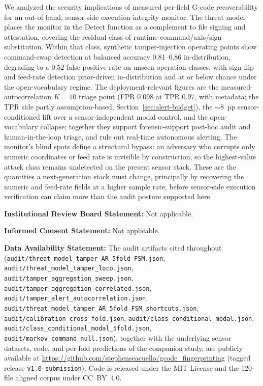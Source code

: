 \documentclass[sensors,article,submit,moreauthors,pdftex]{Definitions/mdpi}
\providecommand{\institutionalreview}[1]{\medskip\noindent\textbf{Institutional Review Board Statement:} #1\par}
\providecommand{\informedconsent}[1]{\medskip\noindent\textbf{Informed Consent Statement:} #1\par}
\providecommand{\dataavailability}[1]{\medskip\noindent\textbf{Data Availability Statement:} #1\par}
\begin{document}
We analyzed the security implications of measured per-field G-code recoverability for an out-of-band, sensor-side execution-integrity monitor. The threat model places the monitor in the Detect function as a complement to file signing and attestation, covering the residual class of runtime command/axis/sign substitution. Within that class, synthetic tamper-injection operating points show command-swap detection at balanced accuracy $0.81$--$0.86$ in-distribution, degrading to a $0.52$ false-positive rate on unseen operation classes, with sign-flip and feed-rate detection prior-driven in-distribution and at or below chance under the open-vocabulary regime. The deployment-relevant figures are the measured-autocorrelation $K\!=\!10$ triage point (FPR $0.098$ at TPR $0.97$, with metadata; the TPR side partly assumption-based, Section~\ref{sec:alert-budget}), the $\sim\!8$~pp sensor-conditioned lift over a sensor-independent modal control, and the open-vocabulary collapse; together they support forensic-support post-hoc audit and human-in-the-loop triage, and rule out real-time autonomous alerting. The monitor's blind spots define a structural bypass: an adversary who corrupts only numeric coordinates or feed rate is invisible by construction, so the highest-value attack class remains undetected on the present sensor stack. These are the quantities a next-generation stack must change, principally by recovering the numeric and feed-rate fields at a higher sample rate, before sensor-side execution verification can claim more than the audit posture supported here.



\institutionalreview{Not applicable.}

\informedconsent{Not applicable.}

\dataavailability{The audit artifacts cited throughout (\texttt{audit/threat\_model\_tamper\_AR\_5fold\_FSM.json}, \texttt{audit/threat\_model\_tamper\_loco.json}, \texttt{audit/tamper\_aggregation\_sweep.json}, \texttt{audit/tamper\_aggregation\_correlated.json}, \texttt{audit/tamper\_alert\_autocorrelation.json}, \texttt{audit/threat\_model\_tamper\_AR\_5fold\_FSM\_shortcuts.json}, \texttt{audit/calibration\_cross\_fold.json}, \texttt{audit/class\_conditional\_modal.json}, \texttt{audit/class\_conditional\_modal\_5fold.json}, \texttt{audit/markov\_command\_null.json}), together with the underlying sensor datasets, code, and per-fold predictions of the companion study, are publicly available at \url{https://github.com/stephenseacuello/gcode_fingerprinting} (tagged release \texttt{v1.0-submission}). Code is released under the MIT License and the 120-file aligned corpus under CC~BY~4.0.}
\end{document}
